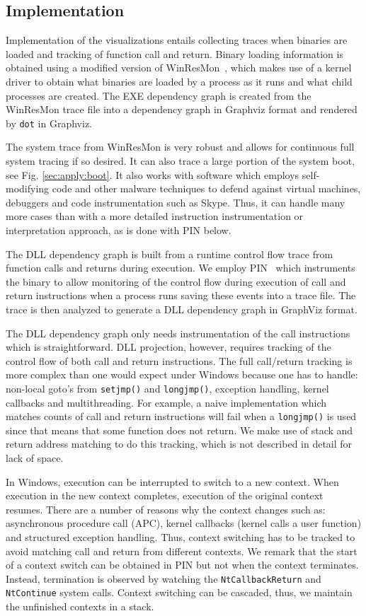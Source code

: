 \subsection{Implementation}

Implementation of the visualizations entails collecting tra\-ces when
binaries are loaded and tracking of function call and return.
Binary loading information is obtained using
a modified version of WinResMon~\cite{ramnath2006winresmon},
which makes use of a kernel driver to obtain
what binaries are loaded by a process as it runs and
what child processes are created.
The EXE dependency graph is created from
the WinResMon trace file into a dependency graph in
Graphviz \cite{ellson2002graphviz} format and rendered by {\tt dot} in Graphviz.

The system trace from WinResMon is very robust and allows for continuous
full system tracing if so desired.
It can also trace a large portion of the system boot,
see Fig. \ref{sec:apply:boot}.
It also works with software which employs self-modifying
code and other malware techniques to defend against virtual machines,
debuggers and code instrumentation such as Skype.
Thus, it can handle many more cases than with a more detailed
instruction instrumentation or interpretation approach, as is done
with PIN below.

The DLL dependency graph is built from a runtime control flow trace from
function calls and returns during execution.
We employ PIN~\cite{luk2005pin} which instruments the binary to allow monitoring
of the control flow during execution of call and return instructions
when a process runs saving these events into a trace file.
The trace is then analyzed to generate a DLL dependency graph in
GraphViz format.

The DLL dependency graph only needs instrumentation of the call instructions
which is straightforward.
DLL projection, however, requires tracking of the control flow of both
call and return instructions.
The full call/return tracking is more complex than one would expect
under Windows because one has to handle:
non-local goto's from {\tt setjmp()} and {\tt longjmp()}, exception handling,
kernel callbacks and multithreading.
For example, a naive implementation which matches counts of call and
return instructions will fail when a {\tt longjmp()} is used
since that means that some function does not return.
We make use of stack and return address matching to do this
tracking, which is not described in detail for lack of space.

In Windows, execution can be interrupted to switch to a new context.
When execution in the new context completes, execution of the original
context resumes.
There are a number of reasons why the context changes
such as: asynchronous procedure call (APC), kernel callbacks
(kernel calls a user function) and structured exception handling.
Thus, context switching has to be tracked to avoid matching
call and return from different contexts.
We remark that the start of a context switch can be obtained in PIN but
not when the context terminates.
Instead, termination is observed by watching the {\tt NtCallbackReturn}
and {\tt NtContinue} system calls.
Context switching can be cascaded, thus, we maintain the unfinished
contexts in a stack.


